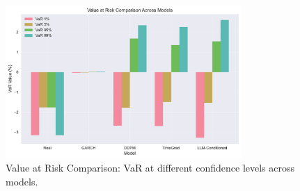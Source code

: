 \begin{figure}[htbp]
\centering
\includegraphics[width=0.8\textwidth]{figures/var_comparison.pdf}
\caption{Value at Risk Comparison: VaR at different confidence levels across models.}
\label{fig:var_comparison}
\end{figure}